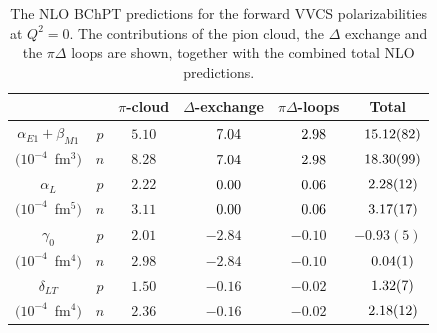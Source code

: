 \documentclass[twocolumn,prc,showpacs,nofootinbib,preprintnumbers,amsmath,amssymb,superscriptaddress]{revtex4-1}
\def\hpm{\hphantom{-}}
\begin{document}
\begin{table}[tb]
\begin{tabular}{cc|c|c|c|c|}
\cline{3-6} 
&& $\pi$-cloud & $\Delta$-exchange   & $\pi\Delta$-loops & Total \\
\hline
\multicolumn{1}{|c||}{$\alpha_{E1}+\beta_{M1}$} &$p$&$5.10$&$\hpm7.04$&$\hpm2.98$&$\hpm15.12(82)$\\
\multicolumn{1}{|c||}{$(10^{-4}$~fm$^3)$} &$n$&$8.28$&$\hpm7.04$&$\hpm2.98$&$\hpm18.30(99)$\\
\hline
\multicolumn{1}{|c||}{$\alpha_L$}&$p$ &$2.22$&$\hpm0.00$&$\hpm0.06$&$\hpm2.28(12)$\\
\multicolumn{1}{|c||}{$(10^{-4}$~fm$^5)$} &$n$&$3.11$&$\hpm0.00$&$\hpm0.06$&$\hpm3.17(17)$\\
\hline
\multicolumn{1}{|c||}{$\,\gamma_0 \,$}&$p$ &$2.01$&$-2.84$&$-0.10$&$-0.93(5)$ \\
\multicolumn{1}{|c||}{$(10^{-4}$~fm$^4)$} &$n$&$2.98$&$-2.84$&$-0.10$&$\hpm0.04(1)$\\
\hline
\multicolumn{1}{|c||}{$\delta_{LT}$}&$p$&$1.50$&$-0.16$&$-0.02$&$\hpm1.32(7)$\\
\multicolumn{1}{|c||}{$(10^{-4}$~fm$^4)$}&$n$ &$2.36$&$-0.16$&$-0.02$&$\hpm2.18(12)$\\
\hline
\end{tabular}
\caption{The NLO BChPT predictions for the forward VVCS polarizabilities at $Q^2=0$. The contributions of the pion cloud, the $\Delta$ exchange and the $\pi\Delta$ loops are shown, together with the combined total NLO predictions.
\label{Table:Individual-Results-Pol}}
\end{table}
\end{document}
